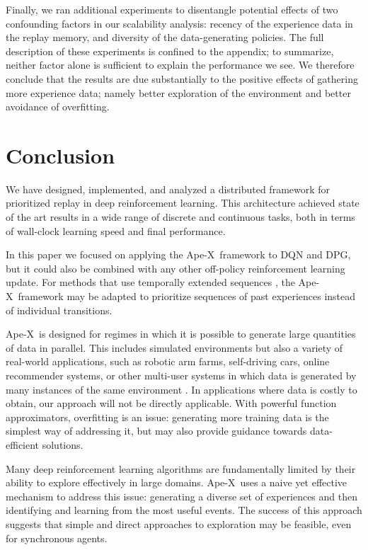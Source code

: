 \documentclass{article} \PassOptionsToPackage{usenames,dvipsnames}{xcolor}
\def\apex{Ape-X}
\begin{document}
Finally, we ran additional experiments to disentangle potential effects of two confounding factors in our scalability analysis: recency of the experience data in the replay memory, and diversity of the data-generating policies. The full description of these experiments is confined to the appendix; to summarize, neither factor alone is sufficient to explain the performance we see. We therefore conclude that the results are due substantially to the positive effects of gathering more experience data; namely better exploration of the environment and better avoidance of overfitting.

\section{Conclusion}

We have designed, implemented, and analyzed a distributed framework for prioritized replay in deep reinforcement learning. This architecture achieved state of the art results in a wide range of discrete and continuous tasks, both in terms of wall-clock learning speed and final performance. 

In this paper we focused on applying the \apex\ framework to DQN and DPG, but it could also be combined with any other off-policy reinforcement learning update. For methods that use temporally extended sequences \citep[e.g., ][]{a3c, acer}, the \apex\ framework may be adapted to prioritize sequences of past experiences instead of individual transitions.

\apex\ is designed for regimes in which it is possible to generate large quantities of data in parallel. This includes simulated environments but also a variety of real-world applications, such as robotic arm farms, self-driving cars, online recommender systems, or other multi-user systems in which data is generated by many instances of the same environment \citep[c.f.][]{concurrent-rl}. In applications where data is costly to obtain, our approach will not be directly applicable. With powerful function approximators, overfitting is an issue: generating more training data is the simplest way of addressing it, but may also provide guidance towards data-efficient solutions. 

Many deep reinforcement learning algorithms are fundamentally limited by their ability to explore effectively in large domains. \apex\ uses a naive yet effective mechanism to address this issue: generating a diverse set of experiences and then identifying and learning from the most useful events. The success of this approach suggests that simple and direct approaches to exploration may be feasible, even for synchronous agents.
\end{document}
